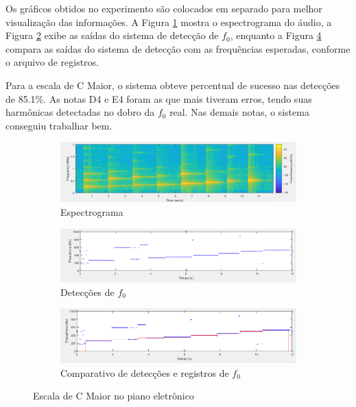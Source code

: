 Os gráficos obtidos no experimento são colocados em separado para melhor visualização das informações. A Figura \ref{fig-piano-escala-2} mostra o espectrograma do áudio, a Figura \ref{fig-piano-escala-3} exibe as saídas do sistema de detecção de $f_0$, enquanto a Figura \ref{fig-piano-escala-4} compara as saídas do sistema de detecção com as frequências esperadas, conforme o arquivo de registros.


Para a escala de C Maior, o sistema obteve percentual de sucesso nas detecções de 85.1\%. As notas D4 e E4 foram as que mais tiveram erros, tendo suas harmônicas detectadas no dobro da $f_0$ real. Nas demais notas, o sistema conseguiu trabalhar bem.

\begin{figure}
	
	\begin{subfigure}{1\textwidth}
		\includegraphics[width=\linewidth]{pasta1_figuras/piano-escala-2.png}
		\caption{Espectrograma}
		\label{fig-piano-escala-2}
	\end{subfigure}
	
	\begin{subfigure}{1\textwidth}
		\includegraphics[width=\linewidth]{pasta1_figuras/piano-escala-3.png}
		\caption{Detecções de $f_0$}
		\label{fig-piano-escala-3}
	\end{subfigure}
	
	\begin{subfigure}{1\textwidth}
		\includegraphics[width=\linewidth]{pasta1_figuras/piano-escala-4.png}
		\caption{Comparativo de detecções e registros de $f_0$}
		\label{fig-piano-escala-4}
	\end{subfigure}
	\caption{Escala de C Maior no piano eletrônico}
\end{figure}

